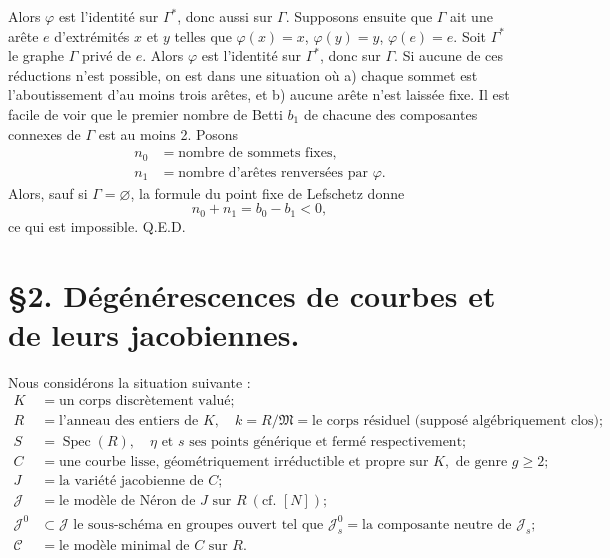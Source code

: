 \documentclass[10pt]{article}
\newcommand{\Spec}{\operatorname{Spec}}
\newcommand{\QED}{\hfill Q.E.D.}
\begin{document}
Alors $\varphi$ est l'identité sur $\Gamma^*$, donc aussi sur $\Gamma$. Supposons ensuite que $\Gamma$ ait une arête $e$ d'extrémités $x$ et $y$ telles que $\varphi(x)=x$, $\varphi(y)=y$, $\varphi(e)=e$. Soit $\Gamma^*$ le graphe $\Gamma$ privé de $e$. Alors $\varphi$ est l'identité sur $\Gamma^*$, donc sur $\Gamma$. Si aucune de ces réductions n'est possible, on est dans une situation où a) chaque sommet est l'aboutissement d'au moins trois arêtes, et b) aucune arête n'est laissée fixe. Il est facile de voir que le premier nombre de Betti $b_1$ de chacune des composantes connexes de $\Gamma$ est au moins 2. Posons
\[
\begin{aligned}
n_0&=\text{nombre de sommets fixes},\\
n_1&=\text{nombre d'arêtes renversées par }\varphi.
\end{aligned}
\]
Alors, sauf si $\Gamma=\varnothing$, la formule du point fixe de Lefschetz donne
\[
n_0+n_1=b_0-b_1<0,
\]
ce qui est impossible. \QED

\section*{\S 2. Dégénérescences de courbes et de leurs jacobiennes.}

Nous considérons la situation suivante :
\begin{align*}
K&=\text{un corps discrètement valué};\\
R&=\text{l'anneau des entiers de }K,\quad k=R/\mathfrak M=\text{le corps résiduel (supposé algébriquement clos)};\\
S&=\Spec(R),\quad \eta\text{ et }s\text{ ses points générique et fermé respectivement};\\
C&=\text{une courbe lisse, géométriquement irréductible et propre sur }K,\text{ de genre }g\geq2;\\
J&=\text{la variété jacobienne de }C;\\
\mathscr J&=\text{le modèle de N\'eron de }J\text{ sur }R\ (\text{cf. }[N]);\\
\mathscr J^0&\subset\mathscr J\text{ le sous-schéma en groupes ouvert tel que }\mathscr J_s^0=\text{la composante neutre de }\mathscr J_s;\\
\mathscr C&=\text{le modèle minimal de }C\text{ sur }R.
\end{align*}
\end{document}
